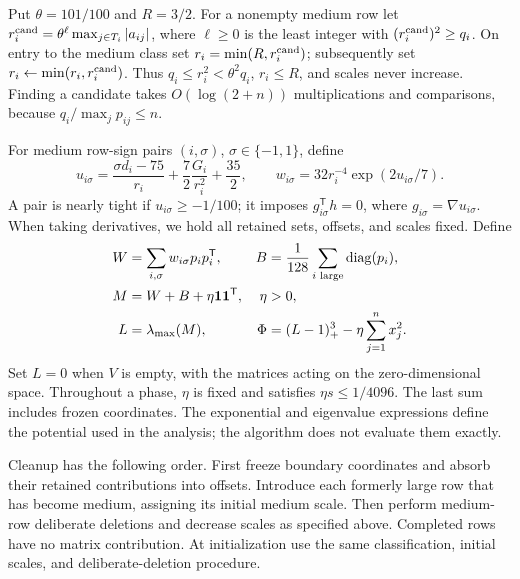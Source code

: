 \documentclass[11pt]{amsart}
\theoremstyle{definition}\newtheorem{definition}[theorem]{Definition}
\theoremstyle{remark}\newtheorem{remark}[theorem]{Remark}
\numberwithin{equation}{section}
\newcommand{\diag}{\operatorname{diag}}
\newcommand{\one}{\mathbf1}
\newcommand{\T}{\mathsf T}
\begin{document}
Put $\theta=101/100$ and $R=3/2$. For a nonempty medium row let
$r_i^{\rm cand}=\theta^\ell\max_{j\in T_i}|a_{ij}|$, where $\ell\ge0$ is the
least integer with $(r_i^{\rm cand})^2\ge q_i$. On entry to the medium class
set $r_i=\min(R,r_i^{\rm cand})$; subsequently set
$r_i\leftarrow\min(r_i,r_i^{\rm cand})$. Thus
$q_i\le r_i^2<\theta^2q_i$, $r_i\le R$, and scales never increase.
Finding a candidate takes $O(\log(2+n))$ multiplications and comparisons,
because $q_i/\max_jp_{ij}\le n$.

For medium row-sign pairs $(i,\sigma)$, $\sigma\in\{-1,1\}$, define
\begin{equation}\label{b:eq:barriers}
 u_{i\sigma}=\frac{\sigma d_i-75}{r_i}
                +\frac72\frac{G_i}{r_i^2}+\frac{35}2,
 \qquad w_{i\sigma}=32r_i^{-4}\exp(2u_{i\sigma}/7).
\end{equation}
A pair is nearly tight if $u_{i\sigma}\ge-1/100$; it imposes
$g_{i\sigma}^\T h=0$, where $g_{i\sigma}=\nabla u_{i\sigma}$.
When taking derivatives, we hold all retained sets, offsets, and scales fixed.
Define
\begin{align}\label{b:eq:potential}
 W&=\sum_{i,\sigma}w_{i\sigma}p_ip_i^\T,&
 B&=\frac1{128}\sum_{i\text{ large}}\diag(p_i),\notag\\
 M&=W+B+\eta\one\one^\T,&
 \eta&>0,\notag\\
 L&=\lambda_{\max}(M),&
 \Phi&=(L-1)_+^3-\eta\sum_{j=1}^n x_j^2.
\end{align}
Set $L=0$ when $V$ is empty, with the matrices acting on the zero-dimensional
space. Throughout a phase, $\eta$ is fixed and satisfies $\eta s\le1/4096$.
The last sum includes frozen coordinates. The exponential and eigenvalue
expressions define the potential used in the analysis; the algorithm does
not evaluate them exactly.

Cleanup has the following order. First freeze boundary coordinates and absorb
their retained contributions into offsets. Introduce each formerly large row
that has become medium, assigning its initial medium scale. Then perform
medium-row deliberate deletions and decrease scales as specified above.
Completed rows have no matrix contribution. At initialization use the same
classification, initial scales, and deliberate-deletion procedure.
\end{document}
